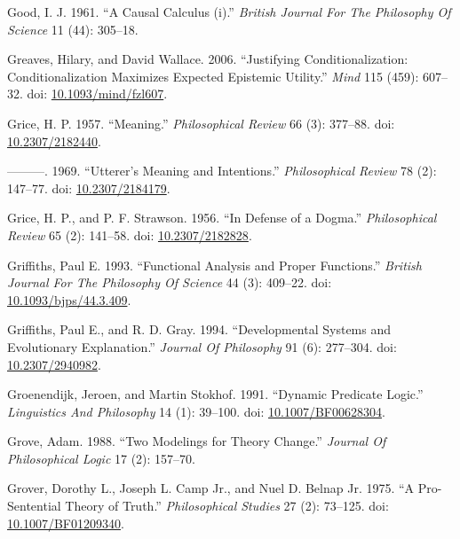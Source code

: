 \documentclass[
  10pt,
  letterpaper,
  DIV=11,
  numbers=noendperiod,
  twoside]{scrartcl}
\newlength{\cslhangindent}
\newenvironment{CSLReferences}[2] %
 {\begin{list}{}{%
  \setlength{\itemindent}{0pt}
  \setlength{\leftmargin}{0pt}
  \setlength{\parsep}{0pt}
  \ifodd #1
   \setlength{\leftmargin}{\cslhangindent}
   \setlength{\itemindent}{-1\cslhangindent}
  \fi
  \setlength{\itemsep}{#2\baselineskip}}}
 {\end{list}}
\begin{document}
\begin{CSLReferences}{1}{0}
Good, I. J. 1961. {``A Causal Calculus (i).''} \emph{British Journal For
The Philosophy Of Science} 11 (44): 305--18.

Greaves, Hilary, and David Wallace. 2006. {``Justifying
Conditionalization: Conditionalization Maximizes Expected Epistemic
Utility.''} \emph{Mind} 115 (459): 607--32. doi:
\href{https://doi.org/10.1093/mind/fzl607}{10.1093/mind/fzl607}.

Grice, H. P. 1957. {``Meaning.''} \emph{Philosophical Review} 66 (3):
377--88. doi: \href{https://doi.org/10.2307/2182440}{10.2307/2182440}.

---------. 1969. {``Utterer's Meaning and Intentions.''}
\emph{Philosophical Review} 78 (2): 147--77. doi:
\href{https://doi.org/10.2307/2184179}{10.2307/2184179}.

Grice, H. P., and P. F. Strawson. 1956. {``In Defense of a Dogma.''}
\emph{Philosophical Review} 65 (2): 141--58. doi:
\href{https://doi.org/10.2307/2182828}{10.2307/2182828}.

Griffiths, Paul E. 1993. {``Functional Analysis and Proper Functions.''}
\emph{British Journal For The Philosophy Of Science} 44 (3): 409--22.
doi:
\href{https://doi.org/10.1093/bjps/44.3.409}{10.1093/bjps/44.3.409}.

Griffiths, Paul E., and R. D. Gray. 1994. {``Developmental Systems and
Evolutionary Explanation.''} \emph{Journal Of Philosophy} 91 (6):
277--304. doi: \href{https://doi.org/10.2307/2940982}{10.2307/2940982}.

Groenendijk, Jeroen, and Martin Stokhof. 1991. {``Dynamic Predicate
Logic.''} \emph{Linguistics And Philosophy} 14 (1): 39--100. doi:
\href{https://doi.org/10.1007/BF00628304}{10.1007/BF00628304}.

Grove, Adam. 1988. {``Two Modelings for Theory Change.''} \emph{Journal
Of Philosophical Logic} 17 (2): 157--70.

Grover, Dorothy L., Joseph L. Camp Jr., and Nuel D. Belnap Jr. 1975.
{``A Pro-Sentential Theory of Truth.''} \emph{Philosophical Studies} 27
(2): 73--125. doi:
\href{https://doi.org/10.1007/BF01209340}{10.1007/BF01209340}.


\end{CSLReferences}
\end{document}
